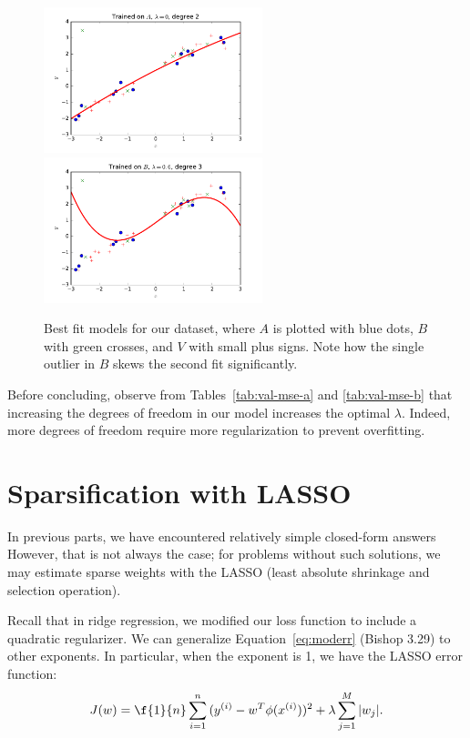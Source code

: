\documentclass{article}
\begin{document}
\begin{multicols}{2}
\begin{figure}
   \centering
   \includegraphics[width=2.5in]{img/3-2_lambda0_degree2.pdf}
   \includegraphics[width=2.5in]{img/3-2_lambda6_degree3.pdf}
   \caption{Best fit models for our dataset, where $A$ is plotted with blue dots, $B$ with green crosses, and $V$ with small plus signs. Note how the single outlier in $B$ skews the second fit significantly.}
   \label{fig:3-2-bestfit}
\end{figure}

Before concluding, observe from Tables~\ref{tab:val-mse-a} and \ref{tab:val-mse-b} that increasing the degrees of freedom in our model increases the optimal $\lambda$. Indeed, more degrees of freedom require more regularization to prevent overfitting.



\section{Sparsification with LASSO}
\label{sec:lasso}

In previous parts, we have encountered relatively simple closed-form answers
However, that is not always the case; for problems without such solutions, we may estimate sparse weights with the LASSO (least absolute shrinkage and selection operation).  %

Recall that in ridge regression, we modified our loss function to include a quadratic regularizer. We can generalize Equation~\ref{eq:moderr} (Bishop 3.29) to other exponents. In particular, when the exponent is 1, we have the LASSO error function:
\begin{equation}J(w) = \f{1}{n}\sum_{i=1}^n{(y^{(i)}-w^T\phi(x^{(i)}))^2} + \lambda \sum_{j=1}^M{|w_j|}.\end{equation}


\end{multicols}
\end{document}
